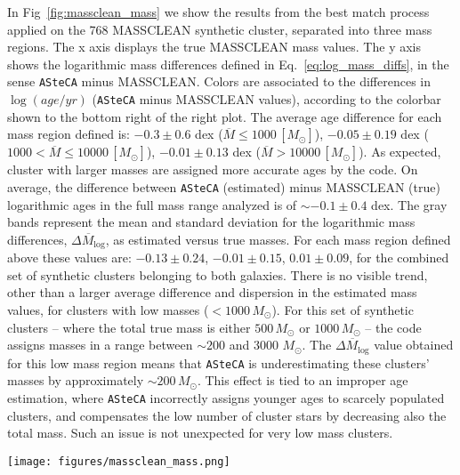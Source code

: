 \documentclass{aa}
\begin{document}
\begin{appendix}
In Fig~\ref{fig:massclean_mass} we show the results from the best match process
applied on the 768 MASSCLEAN synthetic cluster, separated into three mass
regions. The x axis displays the true MASSCLEAN mass values. The y axis shows
the logarithmic mass differences defined in Eq.~\ref{eq:log_mass_diffs}, in the
sense \texttt{ASteCA} minus MASSCLEAN.
%
Colors are associated to the differences in $\log(age/yr)$
(\texttt{ASteCA} minus MASSCLEAN values), according to the colorbar shown to the
bottom right of the right plot. The average age difference for each mass
region defined is: 
$-0.3{\pm}0.6$ dex ($\overline{M}{\le}1000\,[M_{\odot}]$),
$-0.05{\pm}0.19$ dex ($1000{<}\overline{M}{\le}10000\,[M_{\odot}]$),
$-0.01{\pm}0.13$ dex ($\overline{M}{>}10000\,[M_{\odot}]$). As expected, cluster
with larger masses are assigned more accurate ages by the code.
On average, the difference between \texttt{ASteCA} (estimated) minus MASSCLEAN 
(true) logarithmic ages in the full mass range analyzed is of ${\sim}-0.1
{\pm}0.4$ dex.
%
The gray bands represent the mean and standard deviation for the logarithmic
mass differences, $\overline{\Delta M_{\log}}$, as estimated versus true
masses. For each mass region defined above these values are: $-0.13{\pm}0.24$,
$-0.01{\pm}0.15$, $0.01{\pm}0.09$, for the combined set of synthetic clusters
belonging to both galaxies.
%
There is no visible trend, other than a larger average difference and dispersion
in the estimated mass values, for clusters with low masses
(${<}1000\,M_{\odot}$). For this set of synthetic clusters -- where the total
true mass is either $500\,M_{\odot}$ or $1000\,M_{\odot}$ -- the code assigns
masses in a range between ${\sim}200$ and 3000 $M_{\odot}$.
The $\overline{\Delta M_{\log}}$ value obtained for this low mass region means
that \texttt{ASteCA} is underestimating these clusters' masses by approximately
${\sim}200\,M_{\odot}$. This effect is tied to an improper age estimation,
where \texttt{ASteCA} incorrectly assigns younger ages to scarcely populated
clusters, and compensates the low number of cluster stars by decreasing also the
total mass. Such an issue is not unexpected for very low mass clusters.

\begin{figure*}
\texttt{[image: figures/massclean\_mass.png]}
\caption{Recovered masses by \texttt{ASteCA} for the set of 768 MASSCLEAN
synthetic clusters, separated in three mass ranges.
Logarithmic mass differences $\Delta M_{\log}$ are obtained in the sense
\texttt{ASteCA} minus MASSCLEAN (i.e., estimated minus true values), and shown
in the y axis. MASSCLEAN masses in the x axis are perturbed with a small
random scatter to improve visibility.}
\label{fig:massclean_mass}
\end{figure*}


\end{appendix}
\end{document}

